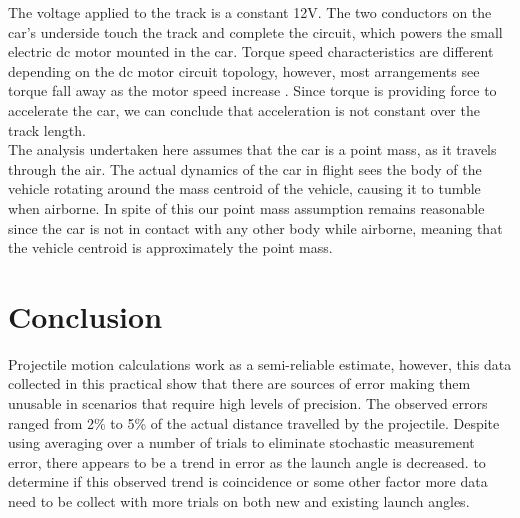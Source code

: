 \documentclass[a4paper]{article}
\begin{document}
The voltage applied to the track is a constant 12$\si{\volt}$. The two conductors on the car's underside touch the track and complete the circuit, which powers the small electric dc motor mounted in the car. Torque speed characteristics are different depending on the dc motor circuit topology, however, most arrangements see torque fall away as the motor speed increase \cite{Sen:2013}. Since torque is providing force to accelerate the car, we can conclude that acceleration is not constant over the track length.\\

The analysis undertaken here assumes that the car is a point mass, as it travels through the air. The actual dynamics of the car in flight sees the body of the vehicle rotating around the mass centroid of the vehicle, causing it to tumble when airborne. In spite of this our point mass assumption remains reasonable since the car is not in contact with any other body while airborne, meaning that the vehicle centroid is approximately the point mass. 

\section{Conclusion}
Projectile motion calculations work as a semi-reliable estimate, however, this data collected in this practical show that there are sources of error making them unusable in scenarios that require high levels of precision. The observed errors ranged from 2\% to 5\% of the actual distance travelled by the projectile. Despite using averaging over a number of trials to eliminate stochastic measurement error, there appears to be a trend in error as the launch angle is decreased. to determine if this observed trend is coincidence or some other factor more data need to be collect with more trials on both new and existing launch angles.




\end{document}
